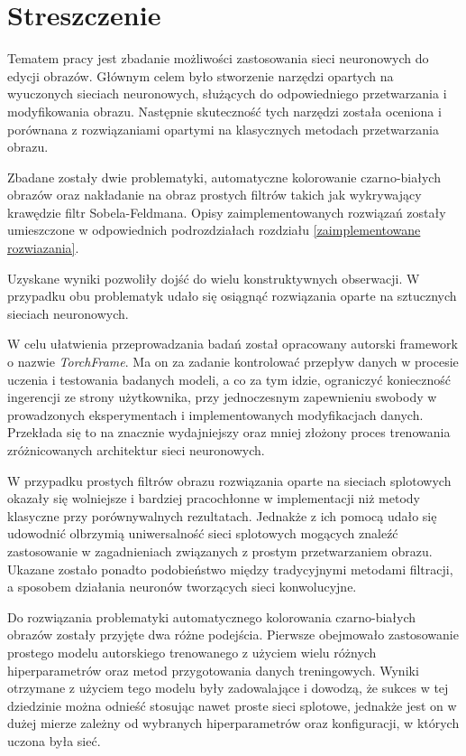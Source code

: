\section*{Streszczenie}

  Tematem pracy jest zbadanie możliwości zastosowania sieci neuronowych do
  edycji obrazów. Głównym celem było stworzenie narzędzi opartych na wyuczonych
  sieciach neuronowych, służących do odpowiedniego przetwarzania i
  modyfikowania obrazu. Następnie skuteczność tych narzędzi została oceniona i
  porównana z rozwiązaniami opartymi na klasycznych metodach przetwarzania obrazu.

  Zbadane zostały dwie problematyki, automatyczne kolorowanie czarno-białych obrazów
  oraz nakładanie na obraz prostych filtrów takich jak wykrywający
  krawędzie filtr Sobela-Feldmana. Opisy zaimplementowanych rozwiązań zostały
  umieszczone w odpowiednich podrozdziałach
  rozdziału \ref{zaimplementowane rozwiazania}.

  Uzyskane wyniki pozwoliły dojść do wielu konstruktywnych obserwacji. W przypadku obu
  problematyk udało się osiągnąć rozwiązania oparte na sztucznych sieciach
  neuronowych.

  W celu ułatwienia przeprowadzania badań został opracowany autorski framework
  o nazwie \textit{TorchFrame}. Ma on za zadanie kontrolować
  przepływ danych w procesie uczenia i testowania badanych modeli, a co za tym
  idzie, ograniczyć konieczność ingerencji ze strony użytkownika, przy jednoczesnym
  zapewnieniu swobody w prowadzonych eksperymentach i implementowanych modyfikacjach danych. Przekłada
  się to na znacznie wydajniejszy oraz mniej złożony proces trenowania
  zróżnicowanych architektur sieci neuronowych.

  W przypadku prostych filtrów obrazu rozwiązania
  oparte na sieciach splotowych okazały się wolniejsze i bardziej pracochłonne w
  implementacji niż metody klasyczne przy porównywalnych rezultatach. Jednakże
  z ich pomocą udało się udowodnić olbrzymią uniwersalność sieci splotowych
  mogących znaleźć zastosowanie w zagadnieniach związanych z prostym
  przetwarzaniem obrazu. Ukazane zostało ponadto podobieństwo między tradycyjnymi
  metodami filtracji, a sposobem działania neuronów tworzących sieci konwolucyjne.

  Do rozwiązania problematyki automatycznego kolorowania czarno-białych
  obrazów zostały przyjęte dwa różne podejścia. Pierwsze obejmowało
  zastosowanie prostego modelu autorskiego trenowanego z użyciem wielu różnych
  hiperparametrów oraz metod przygotowania danych treningowych.
  Wyniki otrzymane z użyciem tego modelu były zadowalające i dowodzą, że
  sukces w tej dziedzinie można odnieść stosując nawet proste sieci splotowe,
  jednakże jest on w dużej mierze zależny od wybranych hiperparametrów oraz
  konfiguracji, w których uczona była sieć.

